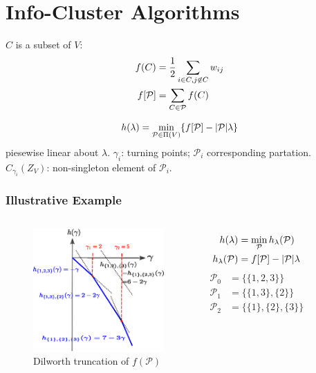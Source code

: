 \documentclass{beamer}
\DeclarePairedDelimiter\abs{\lvert}{\rvert}
\def\P{\mathcal{P}}
\begin{document}
\section{Info-Cluster Algorithms}
\begin{frame}
\begin{definition}
$C$ is a subset of $V$:
\begin{align}
f(C) & ={1 \over 2} \sum_{i\in C, j \not\in C} w_{ij} \\
f[\P] & = \sum_{C \in \P} f(C)
\end{align}
\end{definition}
\begin{theorem}
\begin{equation}\label{eq:hLambda}
h(\lambda) = \min_{\P \in \Pi(V)} \{ f[\P] - \abs{\P}\lambda \}
\end{equation} piesewise linear about $\lambda$. 
$\gamma_i$: turning points; $\P_i$ corresponding partation. $C_{\gamma_i}(Z_V)$: non-singleton element of $\P_i$.
\end{theorem}
\end{frame}
\begin{frame}
\frametitle{Illustrative Example}
\begin{columns}
\column{5cm}
\begin{figure}
\includegraphics[width=5cm]{pic/dt.eps}
\caption{Dilworth truncation of $f(\P)$}
\end{figure}
\column{5cm}
\begin{align*}
h(\lambda)  & = \min_{\P} h_{\lambda}(\P) \\
h_{\lambda}(\P) & = f[\P] - \abs{\P}\lambda
\end{align*}
\begin{align*}
\P_0  & = \{\{1,2,3\}\} \\
\P_1  & = \{\{1,3\},\{2\}\} \\
\P_2  & = \{\{1\},\{2\},\{3\}\} 
\end{align*}

\end{columns}
\end{frame}
\end{document}
